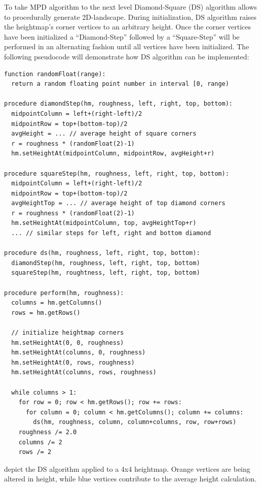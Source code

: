 \documentclass[11pt,a4paper,twoside,openright]{report}
\begin{document}
\noindent To take MPD algorithm to the next level Diamond-Square (DS) algorithm allows to procedurally generate 2D-landscape. During initialization, DS algorithm raises the heightmap's corner vertices to an arbitrary height. Once the corner vertices have been initialized a ``Diamond-Step'' followed by a ``Square-Step'' will be performed in an alternating fashion until all vertices have been initialized. The following pseudocode will demonstrate how DS algorithm can be implemented:

\begin{lstlisting}[caption=DS pseudocode]
function randomFloat(range):
  return a random floating point number in interval [0, range)

procedure diamondStep(hm, roughness, left, right, top, bottom):
  midpointColumn = left+(right-left)/2
  midpointRow = top+(bottom-top)/2
  avgHeight = ... // average height of square corners
  r = roughness * (randomFloat(2)-1)
  hm.setHeightAt(midpointColumn, midpointRow, avgHeight+r)

procedure squareStep(hm, roughness, left, right, top, bottom):
  midpointColumn = left+(right-left)/2
  midpointRow = top+(bottom-top)/2
  avgHeightTop = ... // average height of top diamond corners
  r = roughness * (randomFloat(2)-1)
  hm.setHeightAt(midpointColumn, top, avgHeightTop+r)
  ... // similar steps for left, right and bottom diamond

procedure ds(hm, roughness, left, right, top, bottom):
  diamondStep(hm, roughness, left, right, top, bottom)
  squareStep(hm, roughtness, left, right, top, bottom)

procedure perform(hm, roughness):
  columns = hm.getColumns()
  rows = hm.getRows()

  // initialize heightmap corners
  hm.setHeightAt(0, 0, roughness)
  hm.setHeightAt(columns, 0, roughness)
  hm.setHeightAt(0, rows, roughness)
  hm.setHeightAt(columns, rows, roughness)

  while columns > 1:
    for row = 0; row < hm.getRows(); row += rows:
      for column = 0; column < hm.getColumns(); column += columns:
        ds(hm, roughness, column, column+columns, row, row+rows)
    roughness /= 2.0
    columns /= 2
    rows /= 2
\end{lstlisting}

\noindent {} depict the DS algorithm applied to a 4x4 heightmap. Orange vertices are being altered in height, while blue vertices contribute to the average height calculation.
\end{document}
